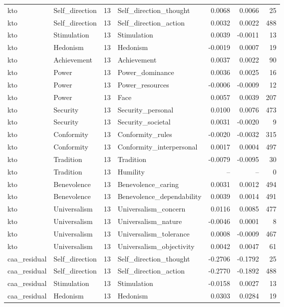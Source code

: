 \begin{tabular}{llrlrrr}
kto & Self\_direction & 13 & Self\_direction\_thought & 0.0068 & 0.0066 & 25 \\
kto & Self\_direction & 13 & Self\_direction\_action & 0.0032 & 0.0022 & 488 \\
kto & Stimulation & 13 & Stimulation & 0.0039 & -0.0011 & 13 \\
kto & Hedonism & 13 & Hedonism & -0.0019 & 0.0007 & 19 \\
kto & Achievement & 13 & Achievement & 0.0037 & 0.0022 & 90 \\
kto & Power & 13 & Power\_dominance & 0.0036 & 0.0025 & 16 \\
kto & Power & 13 & Power\_resources & -0.0006 & -0.0009 & 12 \\
kto & Power & 13 & Face & 0.0057 & 0.0039 & 207 \\
kto & Security & 13 & Security\_personal & 0.0100 & 0.0076 & 473 \\
kto & Security & 13 & Security\_societal & 0.0031 & -0.0020 & 9 \\
kto & Conformity & 13 & Conformity\_rules & -0.0020 & -0.0032 & 315 \\
kto & Conformity & 13 & Conformity\_interpersonal & 0.0017 & 0.0004 & 497 \\
kto & Tradition & 13 & Tradition & -0.0079 & -0.0095 & 30 \\
kto & Tradition & 13 & Humility & -- & -- & 0 \\
kto & Benevolence & 13 & Benevolence\_caring & 0.0031 & 0.0012 & 494 \\
kto & Benevolence & 13 & Benevolence\_dependability & 0.0039 & 0.0014 & 491 \\
kto & Universalism & 13 & Universalism\_concern & 0.0116 & 0.0085 & 477 \\
kto & Universalism & 13 & Universalism\_nature & -0.0046 & 0.0001 & 8 \\
kto & Universalism & 13 & Universalism\_tolerance & 0.0008 & -0.0009 & 467 \\
kto & Universalism & 13 & Universalism\_objectivity & 0.0042 & 0.0047 & 61 \\
caa\_residual & Self\_direction & 13 & Self\_direction\_thought & -0.2706 & -0.1792 & 25 \\
caa\_residual & Self\_direction & 13 & Self\_direction\_action & -0.2770 & -0.1892 & 488 \\
caa\_residual & Stimulation & 13 & Stimulation & -0.0158 & 0.0027 & 13 \\
caa\_residual & Hedonism & 13 & Hedonism & 0.0303 & 0.0284 & 19 \\

\end{tabular}
